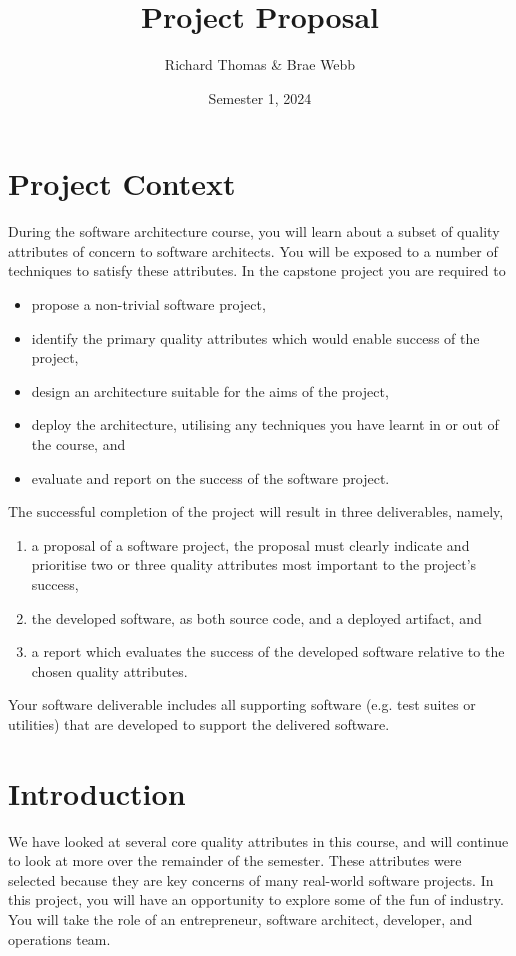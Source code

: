 \documentclass{csse4400}
\title{Project Proposal}
\author{Richard Thomas \& Brae Webb}
\date{Semester 1, 2024}
\begin{document}

\maketitle

\section*{Project Context}
During the software architecture course,
you will learn about a subset of quality attributes of concern to software architects.
You will be exposed to a number of techniques to satisfy these attributes.
In the capstone project you are required to
\begin{itemize}
    \item propose a non-trivial software project,
    \item identify the primary quality attributes which would enable success of the project,
    \item design an architecture suitable for the aims of the project,
    \item deploy the architecture, utilising any techniques you have learnt in or out of the course, and
    \item evaluate and report on the success of the software project.
\end{itemize}

\noindent
The successful completion of the project will result in three deliverables, namely,
\begin{enumerate}[label=\roman*]
    \item a proposal of a software project, the proposal must clearly indicate and prioritise two or three quality attributes most important to the project's success,
    \item the developed software,	 as both source code, and a deployed artifact, and
    \item a report which evaluates the success of the developed software relative to the chosen quality attributes.
\end{enumerate}

\noindent
Your software deliverable includes all supporting software (e.g. test suites or utilities) that are developed to support the delivered software.

\section{Introduction}
We have looked at several core quality attributes in this course, and will continue to look at more over the remainder of the semester.
These attributes were selected because they are key concerns of many real-world software projects.
In this project, you will have an opportunity to explore some of the fun of industry.
You will take the role of an entrepreneur, software architect, developer, and operations team.
\end{document}
